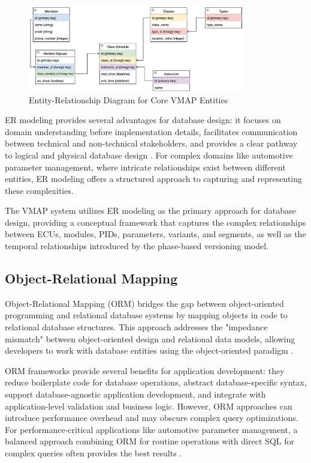 \begin{figure}[ht]
    \centering
    \includegraphics[width=0.85\textwidth]{figures/er_diagram.png}
    \caption{Entity-Relationship Diagram for Core VMAP Entities \cite{RelationalData}}
    \label{fig:er-diagram}
\end{figure}

ER modeling provides several advantages for database design: it focuses on domain understanding before implementation details, facilitates communication between technical and non-technical stakeholders, and provides a clear pathway to logical and physical database design \cite{elmasri2015fundamentals}. For complex domains like automotive parameter management, where intricate relationships exist between different entities, ER modeling offers a structured approach to capturing and representing these complexities.

The VMAP system utilizes ER modeling as the primary approach for database design, providing a conceptual framework that captures the complex relationships between ECUs, modules, PIDs, parameters, variants, and segments, as well as the temporal relationships introduced by the phase-based versioning model.

\subsection{Object-Relational Mapping}
\label{subsec:object-relational-mapping}

Object-Relational Mapping (ORM) bridges the gap between object-oriented programming and relational database systems by mapping objects in code to relational database structures. This approach addresses the "impedance mismatch" between object-oriented design and relational data models, allowing developers to work with database entities using the object-oriented paradigm \cite{ireland2009classification}.

ORM frameworks provide several benefits for application development: they reduce boilerplate code for database operations, abstract database-specific syntax, support database-agnostic application development, and integrate with application-level validation and business logic. However, ORM approaches can introduce performance overhead and may obscure complex query optimizations. For performance-critical applications like automotive parameter management, a balanced approach combining ORM for routine operations with direct SQL for complex queries often provides the best results \cite{ireland2009classification}.

